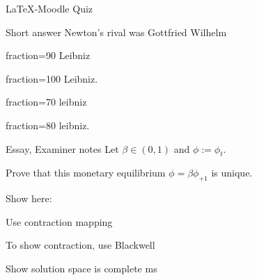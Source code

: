 \documentclass{article}
\begin{document}
\begin{quiz}{LaTeX-Moodle Quiz}
    \begin{shortanswer}[usecase]{Short answer}
        Newton's rival was Gottfried Wilhelm \blank
        \item[fraction=90] Leibniz
        \item[fraction=100] Leibniz.
        \item[fraction=70] leibniz
        \item[fraction=80] leibniz.
    \end{shortanswer}

    \begin{essay}[response format=html+file]{Essay, Examiner notes}
        Let $\beta\in(0,1)$ and $\phi := \phi_{t}$. 
        
        Prove that this monetary equilibrium $\phi = \beta\phi_{+1}$ 
        is unique.

        Show here:
        \item Use contraction mapping
        \item To show contraction, use Blackwell
        \item Show solution space is complete ms   
    \end{essay}


\end{quiz}
\end{document}
